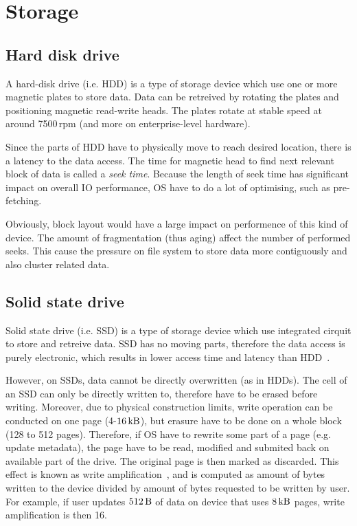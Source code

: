 \documentclass[
  color, %
  table, %
  lof,   %
  lot,   %
]{fithesis3}
\begin{document}
\section{Storage}
\subsection{Hard disk drive}
A hard-disk drive (i.e. HDD) is a type of storage device which use one or more magnetic plates to store data. Data can be retreived by rotating the plates and positioning magnetic read-write heads. The plates rotate at stable speed at around 7500\,rpm (and more on enterprise-level hardware).

Since the parts of HDD have to physically move to reach desired location, there is a latency to the data access. The time for magnetic head to find next relevant block of data is called a \emph{seek time}. Because the length of seek time has significant impact on overall IO performance, OS have to do a lot of optimising, such as pre-fetching.

Obviously, block layout would have a large impact on performence of this kind of device. The amount of fragmentation (thus aging) affect the number of performed seeks. This cause the pressure on file system to store data more contiguously and also cluster related data.

\subsection{Solid state drive}
Solid state drive (i.e. SSD) is  a type of storage device which use integrated cirquit to store and retreive data. SSD has no moving parts, therefore the data access is purely electronic, which results in lower access time and latency than HDD~\cite{kasavajhala2011solid}.

However, on SSDs, data cannot be directly overwritten (as in HDDs). The cell of an SSD can only be directly written to, therefore have to be erased before writing. Moreover, due to physical construction limits, write operation can be conducted on one page (4-$\SI{16}{\kilo\byte}$), but erasure have to be done on a whole block (128 to 512 pages). Therefore, if OS have to rewrite some part of a page (e.g. update metadata), the page have to be read, modified and submited back on available part of the drive. The original page is then marked as discarded. This effect is known as write amplification~\cite{Hu:2009:WAA:1534530.1534544}, and is computed as amount of bytes written to the device divided by amount of bytes requested to be written by user. For example, if user updates $\SI{512}{\byte}$ of data on device that uses $\SI{8}{\kilo\byte}$ pages, write amplification is then 16.
\end{document}
